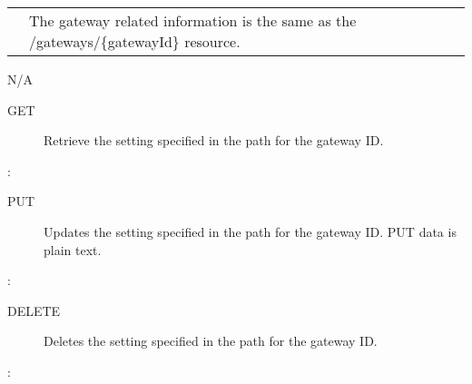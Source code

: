 \documentclass[letterpaper,10pt,english]{sphinxmanual}
\begin{document}
\begin{savenotes}\sphinxattablestart
\centering
\begin{tabulary}{\linewidth}[t]{|T|T|}
\hline

&
\\
\hline
{}
&
The gateway related information is the same as the /gateways/\{gatewayId\} resource.
\\
\hline
\end{tabulary}
\par
\sphinxattableend\end{savenotes}

 N/A
\begin{description}
\item[{ GET}] \leavevmode
Retrieve the setting specified in the path for the gateway ID.

\end{description}

:

\begin{sphinxVerbatim}[commandchars=\\\{\}]
\end{sphinxVerbatim}
\begin{description}
\item[{ PUT}] \leavevmode
Updates the setting specified in the path for the gateway ID. PUT data is plain text.

\end{description}

:

\begin{sphinxVerbatim}[commandchars=\\\{\}]
\end{sphinxVerbatim}
\begin{description}
\item[{ DELETE}] \leavevmode
Deletes the setting specified in the path for the gateway ID.

\end{description}

:

\begin{sphinxVerbatim}[commandchars=\\\{\}]
\end{sphinxVerbatim}
\end{document}
